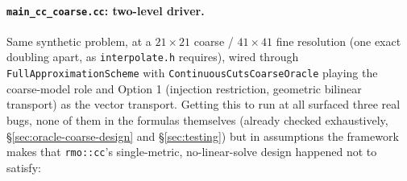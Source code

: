 \documentclass[11pt]{article}
\begin{document}
\paragraph{\texttt{main\_cc\_coarse.cc}: two-level driver.}
\label{sec:mlcc-design}
Same synthetic problem, at a $21\times21$ coarse / $41\times41$ fine resolution (one exact
doubling apart, as \texttt{interpolate.h} requires), wired through
\texttt{FullApproximationScheme} with \texttt{ContinuousCutsCoarseOracle} playing the
coarse-model role and Option 1 (injection restriction, geometric bilinear transport) as the
vector transport. Getting this to run at all surfaced three real bugs, none of them in the
formulas themselves (already checked exhaustively, \S\ref{sec:oracle-coarse-design} and
\S\ref{sec:testing}) but in assumptions the framework makes that \texttt{rmo::cc}'s single-metric,
no-linear-solve design happened not to satisfy:
\end{document}
